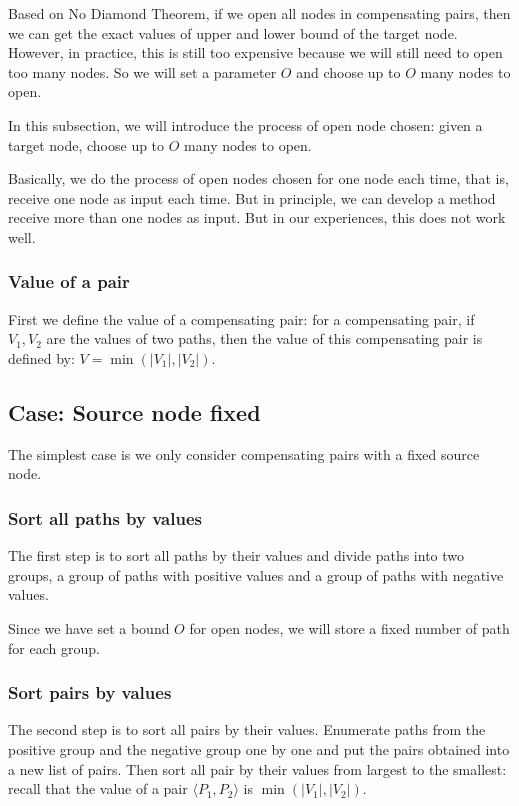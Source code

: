 \documentclass[8pt]{article}
\theoremstyle{definition}
\begin{document}
Based on No Diamond Theorem, if we open all nodes in compensating pairs, then we can get the exact values of upper and lower bound of the target node. However, in practice, this is still too expensive because we will still need to open too many nodes. So we will set a parameter $O$ and choose up to $O$ many nodes to open.

In this subsection, we will introduce the process of open node chosen: given a target node, choose up to $O$ many nodes to open.


Basically, we do the process of open nodes chosen for one node each time, that is, receive one node as input each time. But in principle, we can develop a method receive more than one nodes as input. But in our experiences, this does not work well.  



\subsubsection*{Value of a pair}


First we define the value of a compensating pair: for a compensating pair, if $V_1,V_2$ are the values of two paths, then the value of this compensating pair is defined by: $V=\min(|V_1|,|V_2|)$.


\subsection*{Case: Source node fixed}

The simplest case is we only consider compensating pairs with a fixed source node. 

\subsubsection*{Sort all paths by values}

The first step is to sort all paths by their values and divide paths into two groups, a group of paths with positive values and a group of paths with negative values.

Since we have set a bound $O$ for open nodes, we will store  a fixed number of path for each group.

\subsubsection*{Sort pairs by values}

The second step is to sort all pairs by their values. Enumerate paths from the positive group and the negative group one by one and put the pairs obtained into a new list of pairs. Then sort all pair by their values from largest to the smallest: recall that the value of a pair $\langle P_1,P_2\rangle$ is $\min(|V_1|,|V_2|)$.
\end{document}
